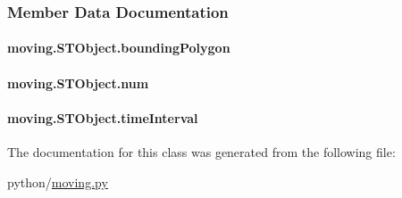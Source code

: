 \subsubsection{Member Data Documentation}
\hypertarget{classmoving_1_1STObject_a7e3b28c042a896c651340e242d964a89}{
\paragraph[{bounding\-Polygon}]{\setlength{\rightskip}{0pt plus 5cm}moving.\-S\-T\-Object.\-bounding\-Polygon}}\label{classmoving_1_1STObject_a7e3b28c042a896c651340e242d964a89}
\hypertarget{classmoving_1_1STObject_a5a1648e7dbb481682fc8079b48c719aa}{
\paragraph[{num}]{\setlength{\rightskip}{0pt plus 5cm}moving.\-S\-T\-Object.\-num}}\label{classmoving_1_1STObject_a5a1648e7dbb481682fc8079b48c719aa}
\hypertarget{classmoving_1_1STObject_a1732f5790d2c3b2c9e7cfa0cdc16495a}{
\paragraph[{time\-Interval}]{\setlength{\rightskip}{0pt plus 5cm}moving.\-S\-T\-Object.\-time\-Interval}}\label{classmoving_1_1STObject_a1732f5790d2c3b2c9e7cfa0cdc16495a}


The documentation for this class was generated from the following file\-:\begin{DoxyCompactItemize}
\item 
python/\hyperlink{moving_8py}{moving.\-py}\end{DoxyCompactItemize}
